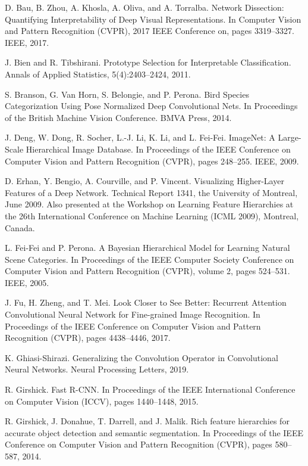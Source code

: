 \documentclass{article}
\theoremstyle{definition}
\theoremstyle{remark}
\begin{document}
\small
%
\begin{thebibliography}{}
 D. Bau, B. Zhou, A. Khosla, A. Oliva, and A. Torralba. Network Dissection: Quantifying Interpretability of Deep Visual Representations. In Computer Vision and Pattern Recognition (CVPR), 2017 IEEE Conference on, pages 3319–3327. IEEE, 2017.

 J. Bien and R. Tibshirani. Prototype Selection for Interpretable Classification. Annals of Applied Statistics, 5(4):2403–2424, 2011.

 S. Branson, G. Van Horn, S. Belongie, and P. Perona. Bird Species Categorization Using Pose Normalized Deep Convolutional Nets. In Proceedings of the British Machine Vision Conference. BMVA Press, 2014.

 J. Deng, W. Dong, R. Socher, L.-J. Li, K. Li, and L. Fei-Fei. ImageNet: A Large-Scale Hierarchical Image Database. In Proceedings of the IEEE Conference on Computer Vision and Pattern Recognition (CVPR), pages 248–255. IEEE, 2009.

 D. Erhan, Y. Bengio, A. Courville, and P. Vincent. Visualizing Higher-Layer Features of a Deep Network. Technical Report 1341, the University of Montreal, June 2009. Also presented at the Workshop on Learning Feature Hierarchies at the 26th International Conference on Machine Learning (ICML 2009), Montreal, Canada.

 L. Fei-Fei and P. Perona. A Bayesian Hierarchical Model for Learning Natural Scene Categories. In Proceedings of the IEEE Computer Society Conference on Computer Vision and Pattern Recognition (CVPR), volume 2, pages 524–531. IEEE, 2005.

 J. Fu, H. Zheng, and T. Mei. Look Closer to See Better: Recurrent Attention Convolutional Neural Network for Fine-grained Image Recognition. In Proceedings of the IEEE Conference on Computer Vision and Pattern Recognition (CVPR), pages 4438–4446, 2017.

 K. Ghiasi-Shirazi. Generalizing the Convolution Operator in Convolutional Neural Networks. Neural Processing Letters, 2019.

 R. Girshick. Fast R-CNN. In Proceedings of the IEEE International Conference on Computer Vision (ICCV), pages 1440–1448, 2015.

 R. Girshick, J. Donahue, T. Darrell, and J. Malik. Rich feature hierarchies for accurate object detection and semantic segmentation. In Proceedings of the IEEE Conference on Computer Vision and Pattern Recognition (CVPR), pages 580–587, 2014.


\end{thebibliography}
\end{document}
